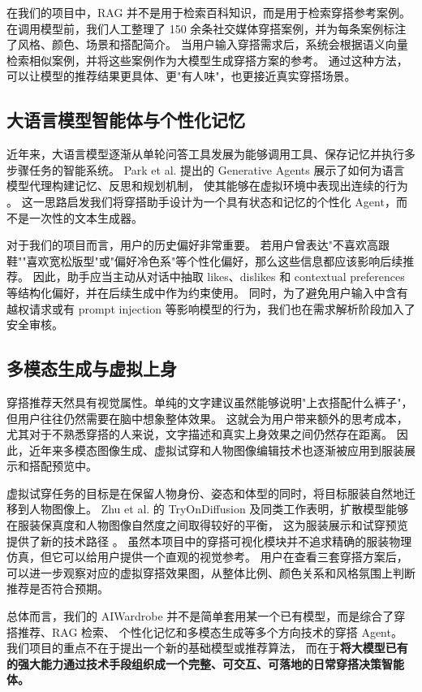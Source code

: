 \documentclass{applemlr}
\begin{document}
在我们的项目中，RAG 并不是用于检索百科知识，而是用于检索穿搭参考案例。
在调用模型前，我们人工整理了 150 余条社交媒体穿搭案例，并为每条案例标注了风格、颜色、场景和搭配简介。
当用户输入穿搭需求后，系统会根据语义向量检索相似案例，并将这些案例作为大模型生成穿搭方案的参考。
通过这种方法，可以让模型的推荐结果更具体、更"有人味"，也更接近真实穿搭场景。

\subsection{大语言模型智能体与个性化记忆}

近年来，大语言模型逐渐从单轮问答工具发展为能够调用工具、保存记忆并执行多步骤任务的智能系统。
Park et al. 提出的 Generative Agents 展示了如何为语言模型代理构建记忆、反思和规划机制，
使其能够在虚拟环境中表现出连续的行为 \citep{park2023generative}。
这一思路启发我们将穿搭助手设计为一个具有状态和记忆的个性化 Agent，而不是一次性的文本生成器。

对于我们的项目而言，用户的历史偏好非常重要。
若用户曾表达"不喜欢高跟鞋""喜欢宽松版型"或"偏好冷色系"等个性化偏好，那么这些信息都应该影响后续推荐。
因此，助手应当主动从对话中抽取 likes、dislikes 和 contextual preferences 等结构化偏好，并在后续生成中作为约束使用。
同时，为了避免用户输入中含有越权请求或有 prompt injection 等影响模型的行为，我们也在需求解析阶段加入了安全审核。

\subsection{多模态生成与虚拟上身}

穿搭推荐天然具有视觉属性。单纯的文字建议虽然能够说明"上衣搭配什么裤子"，但用户往往仍然需要在脑中想象整体效果。
这就会为用户带来额外的思考成本，尤其对于不熟悉穿搭的人来说，文字描述和真实上身效果之间仍然存在距离。
因此，近年来多模态图像生成、虚拟试穿和人物图像编辑技术也逐渐被应用到服装展示和搭配预览中。

虚拟试穿任务的目标是在保留人物身份、姿态和体型的同时，将目标服装自然地迁移到人物图像上。
Zhu et al. 的 TryOnDiffusion 及同类工作表明，扩散模型能够在服装保真度和人物图像自然度之间取得较好的平衡，
这为服装展示和试穿预览提供了新的技术路径 \citep{zhu2023tryondiffusion}。
虽然本项目中的穿搭可视化模块并不追求精确的服装物理仿真，但它可以给用户提供一个直观的视觉参考。
用户在查看三套穿搭方案后，可以进一步观察对应的虚拟穿搭效果图，从整体比例、颜色关系和风格氛围上判断推荐是否符合预期。

总体而言，我们的 AIWardrobe 并不是简单套用某一个已有模型，而是综合了穿搭推荐、RAG 检索、
个性化记忆和多模态生成等多个方向技术的穿搭 Agent。
我们项目的重点不在于提出一个新的基础模型或推荐算法，
而在于\textbf{将大模型已有的强大能力通过技术手段组织成一个完整、可交互、可落地的日常穿搭决策智能体。}
\end{document}
